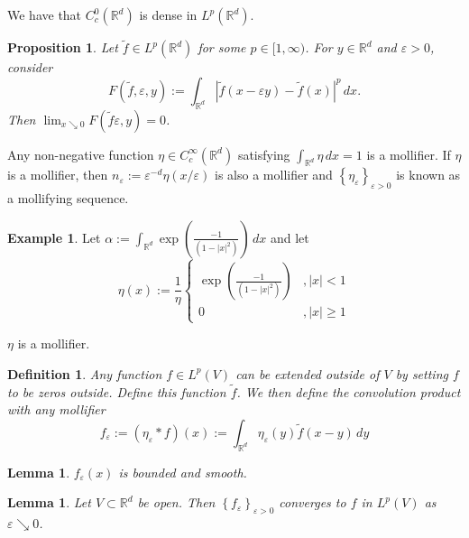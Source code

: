 \documentclass{article}
\newtheorem{proposition}[theorem]{Proposition}
\newtheorem{lemma}[theorem]{Lemma}
\newtheorem{definition}[theorem]{Definition}
\theoremstyle{definition}
\newtheorem{example}[theorem]{Example}
\numberwithin{theorem}{section}
\numberwithin{equation}{section}
\begin{document}
We have that $C^0_c(\mathbb{R}^d)$ is dense in $L^p(\mathbb{R}^d)$. 

\begin{proposition}
	Let $\tilde{f} \in L^p(\mathbb{R}^d)$ for some $p \in [1, \infty)$. For $y \in \mathbb{R}^d$ and $\varepsilon > 0$, consider
	\begin{equation}
		F(\tilde{f}, \varepsilon, y) := \int_{\mathbb{R}^d} |\tilde{f}(x - \varepsilon y) - \tilde{f}(x)|^p \, dx.
	\end{equation}
	Then $\lim_{x \searrow 0} F(\tilde{f} \varepsilon, y) = 0$. 
\end{proposition}
Any non-negative function $\eta \in C^\infty_c(\mathbb{R}^d)$ satisfying $\int_{\mathbb{R}^d} \eta \, dx = 1$ is a mollifier. If $\eta$ is a mollifier, then $n_\varepsilon := \varepsilon^{-d} \eta(x/\varepsilon)$ is also a mollifier and $\left\{\eta_\varepsilon \right\}_{\varepsilon > 0}$ is known as a mollifying sequence. 
\begin{example}
	Let $\alpha := \int_{\mathbb{R}^d}\exp(\frac{-1}{(1 - |x|^2)})\, dx$ and let 
		\begin{equation}
			\eta(x) := \frac{1}{\eta}\begin{cases}
				\exp(\frac{-1}{(1 - |x|^2)}) &, |x| < 1\\
				0 &, |x| \geq 1
			\end{cases}
		\end{equation}
\end{example} 
$\eta$ is a mollifier. 

\begin{definition}
	Any function $f \in L^p(V)$ can be extended outside of $V$ by setting $f$ to be zeros outside. Define this function $\tilde{f}$. We then define the convolution product with any mollifier
	\begin{equation}
		f_\varepsilon := (\eta_\varepsilon \ast f )(x) := \int_{\mathbb{R}^d} \eta_\varepsilon(y) \tilde{f}(x - y) \, dy
	\end{equation}
\end{definition}

\begin{lemma}
	$f_\varepsilon(x)$ is bounded and smooth. 
\end{lemma}

\begin{lemma}
	Let $V \subset \mathbb{R}^d$ be open. Then $\left\{f_\varepsilon \right\}_{\varepsilon > 0}$ converges to $f$ in $L^p(V)$ as $\varepsilon \searrow 0$. 
\end{lemma}
\end{document}
